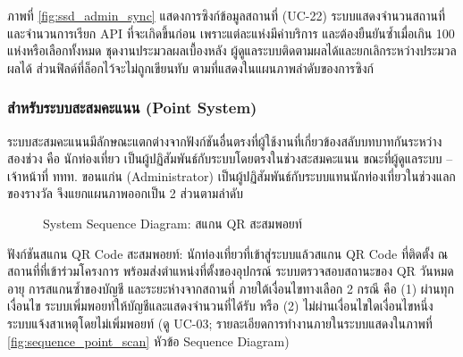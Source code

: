 ภาพที่ \ref{fig:ssd_admin_sync} แสดงการซิงก์ข้อมูลสถานที่ (UC-22) ระบบแสดงจำนวนสถานที่และจำนวนการเรียก API ที่จะเกิดขึ้นก่อน เพราะแต่ละแห่งมีค่าบริการ และต้องยืนยันซ้ำเมื่อเกิน 100 แห่งหรือเลือกทั้งหมด ชุดงานประมวลผลเบื้องหลัง ผู้ดูแลระบบติดตามผลได้และยกเลิกระหว่างประมวลผลได้ ส่วนฟิลด์ที่ล็อกไว้จะไม่ถูกเขียนทับ ตามที่แสดงในแผนภาพลำดับของการซิงก์

\subsubsection{สำหรับระบบสะสมคะแนน (Point System)}

ระบบสะสมคะแนนมีลักษณะแตกต่างจากฟังก์ชันอื่นตรงที่ผู้ใช้งานที่เกี่ยวข้องสลับบทบาทกันระหว่างสองช่วง คือ นักท่องเที่ยว เป็นผู้ปฏิสัมพันธ์กับระบบโดยตรงในช่วงสะสมคะแนน ขณะที่ผู้ดูแลระบบ -- เจ้าหน้าที่ ททท. ขอนแก่น (Administrator) เป็นผู้ปฏิสัมพันธ์กับระบบแทนนักท่องเที่ยวในช่วงแลกของรางวัล จึงแยกแผนภาพออกเป็น 2 ส่วนตามลำดับ

\begin{figure}[H]
\centering
{}
\caption{System Sequence Diagram: สแกน QR สะสมพอยท์}
\label{fig:ssd_point_scan}
\end{figure}

ฟังก์ชันสแกน QR Code สะสมพอยท์: นักท่องเที่ยวที่เข้าสู่ระบบแล้วสแกน QR Code ที่ติดตั้ง ณ สถานที่ที่เข้าร่วมโครงการ พร้อมส่งตำแหน่งที่ตั้งของอุปกรณ์ ระบบตรวจสอบสถานะของ QR วันหมดอายุ การสแกนซ้ำของบัญชี และระยะห่างจากสถานที่ ภายใต้เงื่อนไขทางเลือก 2 กรณี คือ (1) ผ่านทุกเงื่อนไข ระบบเพิ่มพอยท์ให้บัญชีและแสดงจำนวนที่ได้รับ หรือ (2) ไม่ผ่านเงื่อนไขใดเงื่อนไขหนึ่ง ระบบแจ้งสาเหตุโดยไม่เพิ่มพอยท์ (ดู UC-03; รายละเอียดการทำงานภายในระบบแสดงในภาพที่ \ref{fig:sequence_point_scan} หัวข้อ Sequence Diagram)

